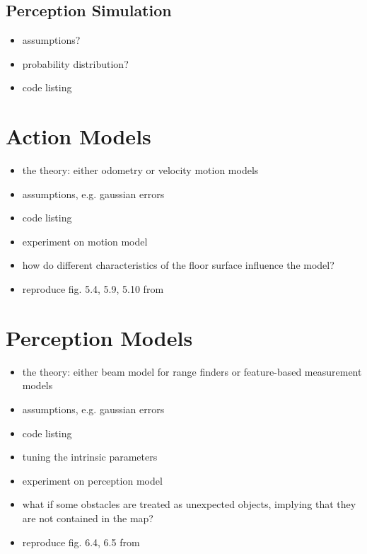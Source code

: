 \documentclass[letterpaper, 10 pt, conference]{ieeeconf}  %
\begin{document}
\subsection{Perception Simulation}
\begin{itemize}
    \item assumptions?
    \item probability distribution?
    \item code listing
\end{itemize}

\section{Action Models}
\begin{itemize}
    \item the theory: either odometry or velocity motion models
    \item assumptions, e.g. gaussian errors
    \item code listing
    \item experiment on motion model
    \item how do different characteristics of the floor surface influence the model?
    \item reproduce fig. 5.4, 5.9, 5.10 from~\cite{Thrun:2005:PR}
\end{itemize}

\section{Perception Models}
\begin{itemize}
    \item the theory: either beam model for range finders or feature-based measurement models
    \item assumptions, e.g. gaussian errors
    \item code listing
    \item tuning the intrinsic parameters
    \item experiment on perception model
    \item what if some obstacles are treated as unexpected objects, implying that they are not contained in the map?
    \item reproduce fig. 6.4, 6.5 from~\cite{Thrun:2005:PR}
\end{itemize}
\end{document}
